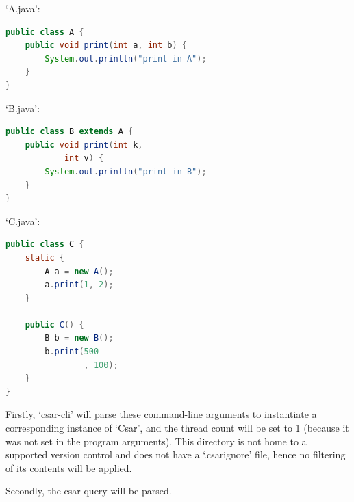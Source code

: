 \documentclass[12pt, letterpaper]{article}
\begin{document}
`A.java':
\begin{lstlisting}[language=Java]
public class A {
    public void print(int a, int b) {
        System.out.println("print in A");
    }
}
\end{lstlisting}

`B.java':
\begin{lstlisting}[language=Java]
public class B extends A {
    public void print(int k,
            int v) {
        System.out.println("print in B");
    }
}
\end{lstlisting}

`C.java':
\begin{lstlisting}[language=Java]
public class C {
    static {
        A a = new A();
        a.print(1, 2);
    }
    
    public C() {
        B b = new B();
        b.print(500
                , 100);
    }
}
\end{lstlisting}

Firstly, `csar-cli' will parse these command-line arguments to instantiate a corresponding instance of `Csar', and the thread count will be set to 1 (because it was not set in the program arguments).
This directory is not home to a supported version control and does not have a `.csarignore' file, hence no filtering of its contents will be applied.

Secondly, the csar query will be parsed.
\end{document}
